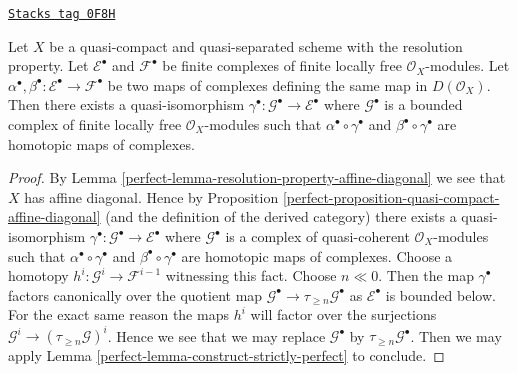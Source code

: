 \begin{lemma}
\label{perfect-lemma-resolution-property-homotopy-map-perfect-complex}
\href{https://stacks.math.columbia.edu/tag/0F8H}{\texttt{Stacks tag 0F8H}}

Let $X$ be a quasi-compact and quasi-separated scheme with the
resolution property. Let $\mathcal{E}^\bullet$ and $\mathcal{F}^\bullet$
be finite complexes of finite locally free $\mathcal{O}_X$-modules.
Let $\alpha^\bullet, \beta^\bullet :\mathcal{E}^\bullet \to \mathcal{F}^\bullet$
be two maps of complexes defining the same map in $D(\mathcal{O}_X)$.
Then there exists a quasi-isomorphism
$\gamma^\bullet : \mathcal{G}^\bullet \to \mathcal{E}^\bullet$
where $\mathcal{G}^\bullet$ is a bounded complex of finite locally free
$\mathcal{O}_X$-modules
such that $\alpha^\bullet \circ \gamma^\bullet$ and
$\beta^\bullet \circ \gamma^\bullet$ are homotopic maps of complexes.
\end{lemma}

\begin{proof}

By Lemma \ref{perfect-lemma-resolution-property-affine-diagonal}
we see that $X$ has affine diagonal. Hence by
Proposition \ref{perfect-proposition-quasi-compact-affine-diagonal}
(and the definition of the derived category)
there exists a quasi-isomorphism
$\gamma^\bullet : \mathcal{G}^\bullet \to \mathcal{E}^\bullet$
where $\mathcal{G}^\bullet$ is a complex of quasi-coherent
$\mathcal{O}_X$-modules
such that $\alpha^\bullet \circ \gamma^\bullet$ and
$\beta^\bullet \circ \gamma^\bullet$ are homotopic maps of complexes.
Choose a homotopy $h^i : \mathcal{G}^i \to \mathcal{F}^{i - 1}$
witnessing this fact. Choose $n \ll 0$. Then the map
$\gamma^\bullet$ factors canonically over the quotient
map $\mathcal{G}^\bullet \to \tau_{\geq n}\mathcal{G}^\bullet$
as $\mathcal{E}^\bullet$ is bounded below. For the exact same
reason the maps $h^i$ will factor over the surjections
$\mathcal{G}^i \to (\tau_{\geq n}\mathcal{G})^i$.
Hence we see that we may replace $\mathcal{G}^\bullet$
by $\tau_{\geq n}\mathcal{G}^\bullet$.
Then we may apply Lemma \ref{perfect-lemma-construct-strictly-perfect} to conclude.
\end{proof}

